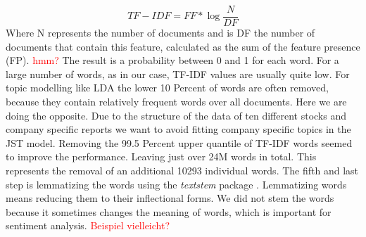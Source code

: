 \begin{equation}
    TF-IDF = FF * \log{\frac{N}{DF}}
\end{equation} 
Where N represents the number of documents and is DF the number of documents that contain this feature, calculated as the sum of the feature presence (FP). \textcolor{red}{hmm?}
The result is a probability between 0 and 1 for each word. For a large number of words, as in our case, TF-IDF values are usually quite low. For topic modelling like LDA the lower 10 Percent of words are often removed, because they contain relatively frequent words over all documents. Here we are doing the opposite. Due to the structure of the data of ten different stocks and company specific reports we want to avoid fitting company specific topics in the JST model. Removing the 99.5 Percent upper quantile of TF-IDF words seemed to improve the performance. Leaving just over 24M words in total. This represents the removal of an additional 10293 individual words. The fifth and last step is lemmatizing the words using the \textit{textstem} package \citep{textstem}. Lemmatizing words means reducing them to their inflectional forms. We did not stem the words because it sometimes changes the meaning of words, which is important for sentiment analysis. \textcolor{red}{Beispiel vielleicht?}\\ \\



